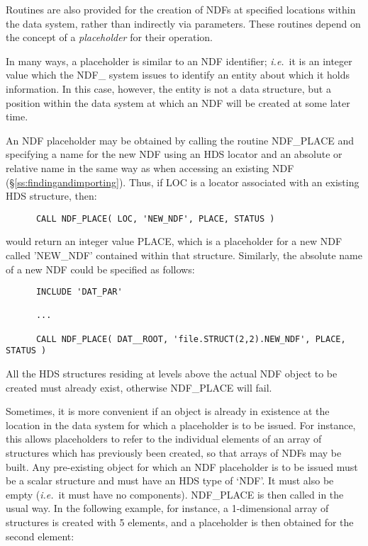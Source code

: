 \documentclass[twoside,11pt]{article}
\newcommand{\htmlref}[2]{#1}
\newcommand{\xref}[3]{#1}
\newcommand{\st}[1]{{\em{#1}}}
\begin{document}
Routines are also provided for the creation of NDFs at specified locations
within the data system, rather than indirectly via parameters.
These routines depend on the concept of a \st{placeholder\/} for their
operation. 

In many ways, a placeholder is similar to an NDF identifier; \st{i.e.}\ it
is an integer value which the NDF\_ system issues to identify an entity
about which it holds information.
In this case, however, the entity is not a data structure, but a position
within the data system at which an NDF will be created at some later time.

An NDF placeholder may be obtained by calling the routine \htmlref{NDF\_PLACE}{NDF_PLACE}
and specifying a name for the new NDF using an \xref{HDS
locator}{sun92}{using_locators} and an absolute or relative name in
the same way as when accessing an existing NDF
(\S\ref{ss:findingandimporting}). Thus, if LOC is a locator associated
with an existing HDS structure, then:

\small
\begin{verbatim}
      CALL NDF_PLACE( LOC, 'NEW_NDF', PLACE, STATUS )
\end{verbatim}
\normalsize

would return an integer value PLACE, which is a placeholder for a new
NDF called 'NEW\_NDF' contained within that structure. Similarly,
the absolute name of a new NDF could be specified as follows:

\small
\begin{verbatim}
      INCLUDE 'DAT_PAR'

      ...

      CALL NDF_PLACE( DAT__ROOT, 'file.STRUCT(2,2).NEW_NDF', PLACE, STATUS )
\end{verbatim}
\normalsize

All the HDS structures residing at levels above the actual NDF object
to be created must already exist, otherwise NDF\_PLACE will fail.

Sometimes, it is more convenient if an object is already in existence
at the location in the data system for which a placeholder is to be
issued.
For instance, this allows placeholders to refer to the individual
elements of an array of structures which has previously been created,
so that arrays of NDFs may be built.
Any pre-existing object for which an NDF placeholder is to be issued
must be a scalar structure and must have an HDS type of `NDF'.
It must also be empty (\st{i.e.}\ it must have no components).
NDF\_PLACE is then called in the usual way.
In the following example, for instance, a 1-dimensional array of
structures is created with 5 elements, and a placeholder is then
obtained for the second element:
\end{document}
